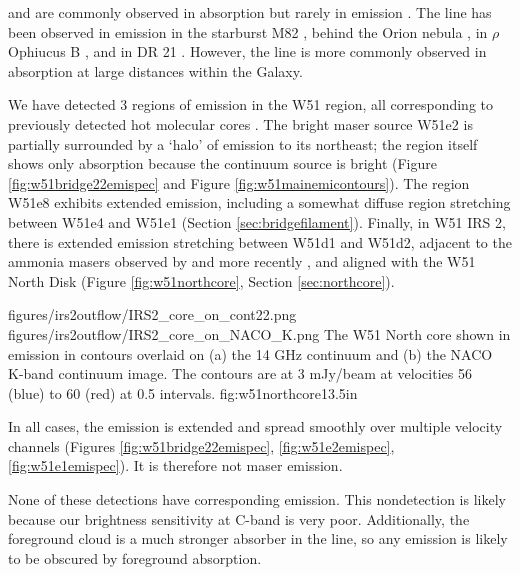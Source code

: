 \formaldehyde \oneone and \twotwo are commonly observed in absorption
but rarely in emission \citep[e.g.][]{Mangum1993a,Araya2007b}.  The \twotwo
line has been observed in emission in the starburst M82 \citep{Mangum2008a},
behind the Orion nebula
\citep{Evans1975a,Kutner1976a,Batrla1983a,Johnston1983a,Bastien1985a,Wilson1989a},
in $\rho$ Ophiucus B
\citep{Loren1980a,Loren1983a,Martin-Pintado1983a,Wadiak1985a}, and in DR 21
\citep{Wilson1982a,Johnston1984a}.  However, the \twotwo line is more commonly
observed in absorption at large distances within the Galaxy.

We have detected 3 regions of \twotwo emission in the W51 region, all
corresponding to previously detected hot molecular cores
\citep{Zhang1997a,Shi2010a,Shi2010b,Goddi2015a}.  The bright
maser source W51e2 is partially surrounded by a `halo' of \formaldehyde \twotwo
emission to its northeast; the \hchii region itself shows only \twotwo
absorption because the continuum source is bright
(Figure \ref{fig:w51bridge22emispec} and Figure \ref{fig:w51mainemicontours}).
The \hchii region W51e8 exhibits extended \twotwo emission, including a
somewhat
diffuse region stretching between W51e4 and W51e1 (Section
\ref{sec:bridgefilament}).  Finally, in W51 IRS 2, there is extended \twotwo
emission stretching between W51d1 and W51d2, adjacent to the ammonia masers
observed by \citet{Zhang1995a} and more recently \citet{Goddi2015a}, and
aligned with the \citet{Zapata2010a} W51 North Disk (Figure
\ref{fig:w51northcore}, Section \ref{sec:northcore}).

\FigureTwo
{figures/irs2outflow/IRS2_core_on_cont22.png}
{figures/irs2outflow/IRS2_core_on_NACO_K.png}
{The W51 North core shown in \formaldehyde \twotwo emission in contours
overlaid on (a) the 14 GHz continuum and (b) the NACO K-band continuum image.
The contours are at 3 mJy/beam at velocities 56 (blue) to 60 (red) \kms at 0.5
\kms intervals.
}
{fig:w51northcore}{1}{3.5in}

In all cases, the emission is extended and spread smoothly over multiple
velocity channels (Figures 
\ref{fig:w51bridge22emispec}, \ref{fig:w51e2emispec}, \ref{fig:w51e1emispec}).
It is therefore not maser emission.

None of these detections have corresponding \oneone emission.  This
nondetection is likely because our brightness sensitivity at C-band is very
poor.    Additionally,
the foreground cloud is a much stronger absorber in the \oneone line, so any
emission is likely to be obscured by foreground absorption.

